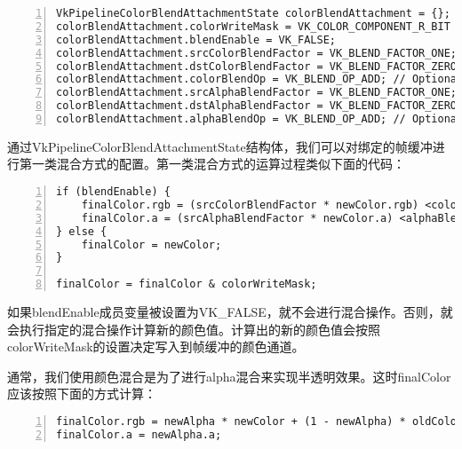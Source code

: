 \documentclass{ctexart}
\begin{document}
\begin{lstlisting}[language={[ANSI]C},keywordstyle=\color{blue!70},commentstyle=\color{red!50!green!50!blue!50},frame=shadowbox, rulesepcolor=\color{red!20!green!20!blue!20},basicstyle=\small,numbers=left, numberstyle=\tiny,breaklines=true]
VkPipelineColorBlendAttachmentState colorBlendAttachment = {};
colorBlendAttachment.colorWriteMask = VK_COLOR_COMPONENT_R_BIT | VK_COLOR_COMPONENT_G_BIT | VK_COLOR_COMPONENT_B_BIT | VK_COLOR_COMPONENT_A_BIT;
colorBlendAttachment.blendEnable = VK_FALSE;
colorBlendAttachment.srcColorBlendFactor = VK_BLEND_FACTOR_ONE; // Optional
colorBlendAttachment.dstColorBlendFactor = VK_BLEND_FACTOR_ZERO; // Optional
colorBlendAttachment.colorBlendOp = VK_BLEND_OP_ADD; // Optional
colorBlendAttachment.srcAlphaBlendFactor = VK_BLEND_FACTOR_ONE; // Optional
colorBlendAttachment.dstAlphaBlendFactor = VK_BLEND_FACTOR_ZERO; // Optional
colorBlendAttachment.alphaBlendOp = VK_BLEND_OP_ADD; // Optional
\end{lstlisting}

通过VkPipelineColorBlendAttachmentState结构体，我们可以对绑定的帧缓冲进行第一类混合方式的配置。第一类混合方式的运算过程类似下面的代码：

\begin{lstlisting}[language={[ANSI]C},keywordstyle=\color{blue!70},commentstyle=\color{red!50!green!50!blue!50},frame=shadowbox, rulesepcolor=\color{red!20!green!20!blue!20},basicstyle=\small,numbers=left, numberstyle=\tiny,breaklines=true]
if (blendEnable) {
	finalColor.rgb = (srcColorBlendFactor * newColor.rgb) <colorBlendOp> (dstColorBlendFactor * oldColor.rgb);
	finalColor.a = (srcAlphaBlendFactor * newColor.a) <alphaBlendOp> (dstAlphaBlendFactor * oldColor.a);
} else {
	finalColor = newColor;
}

finalColor = finalColor & colorWriteMask;
\end{lstlisting}

如果blendEnable成员变量被设置为VK\_FALSE，就不会进行混合操作。否则，就会执行指定的混合操作计算新的颜色值。计算出的新的颜色值会按照colorWriteMask的设置决定写入到帧缓冲的颜色通道。

通常，我们使用颜色混合是为了进行alpha混合来实现半透明效果。这时finalColor应该按照下面的方式计算：

\begin{lstlisting}[language={[ANSI]C},keywordstyle=\color{blue!70},commentstyle=\color{red!50!green!50!blue!50},frame=shadowbox, rulesepcolor=\color{red!20!green!20!blue!20},basicstyle=\small,numbers=left, numberstyle=\tiny,breaklines=true]
finalColor.rgb = newAlpha * newColor + (1 - newAlpha) * oldColor;
finalColor.a = newAlpha.a;
\end{lstlisting}
\end{document}
